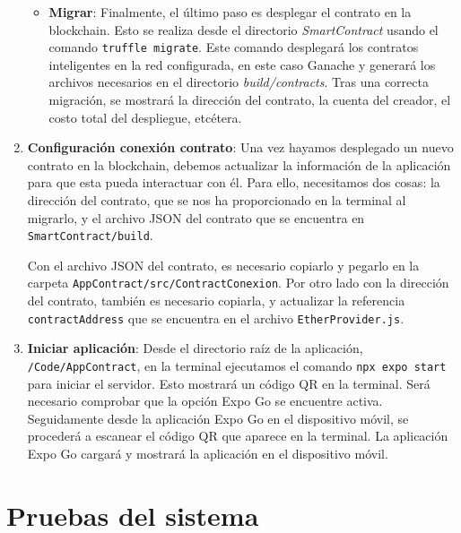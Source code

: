 \begin{enumerate}
	\begin{itemize}
	\item \textbf{Migrar}: Finalmente, el último paso es desplegar el contrato en la blockchain.
	Esto se realiza desde el directorio \textit{SmartContract} usando el comando \texttt{truffle migrate}.
	Este comando desplegará los contratos inteligentes en la red configurada, en este caso Ganache y generará
	los archivos necesarios en el directorio \textit{build/contracts}.
	Tras una correcta migración, se mostrará la dirección del contrato, la cuenta del creador, el costo total
	del despliegue, etcétera. 
	
	\end{itemize}
	
	
\item \textbf{Configuración conexión contrato}: Una vez hayamos desplegado un nuevo contrato en la blockchain, debemos actualizar la información de la aplicación para que esta pueda interactuar con él.
Para ello, necesitamos dos cosas: la dirección del contrato, que se nos ha proporcionado en la terminal al migrarlo, y el archivo JSON del contrato que se encuentra en \texttt{SmartContract/build}.
	
Con el archivo JSON del contrato, es necesario copiarlo y pegarlo en la carpeta \texttt{AppContract/src/ContractConexion}. 
Por otro lado con la dirección del contrato, también es necesario copiarla, y actualizar la referencia \texttt{contractAddress} que se encuentra en el archivo \texttt{EtherProvider.js}.
	

\item \textbf{Iniciar aplicación}: Desde el directorio raíz de la aplicación, \texttt{/Code/AppContract}, en la terminal ejecutamos el comando \texttt{npx expo start} para iniciar el servidor. Esto mostrará un código QR en la terminal. Será necesario comprobar que la opción Expo Go se encuentre activa.
Seguidamente desde la aplicación Expo Go en el dispositivo móvil, se procederá a escanear el código QR que aparece en la terminal.
La aplicación Expo Go cargará y mostrará la aplicación en el dispositivo móvil.

\end{enumerate}

\section{Pruebas del sistema}

